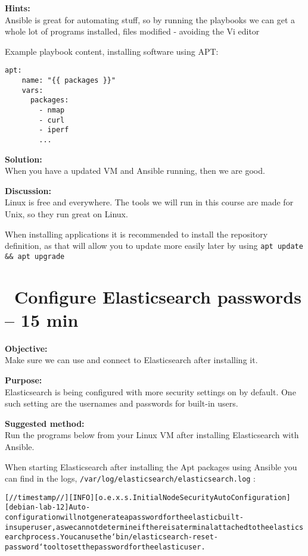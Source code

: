 \documentclass[a4paper,11pt,notitlepage]{report}
\begin{document}
{\bf Hints:}\\
Ansible is great for automating stuff, so by running the playbooks we can get a whole lot of programs installed, files modified - avoiding the Vi editor \smiley

Example playbook content, installing software using APT:
\begin{verbatim}
apt:
    name: "{{ packages }}"
    vars:
      packages:
        - nmap
        - curl
        - iperf
        ...
\end{verbatim}

{\bf Solution:}\\
When you have a updated VM and Ansible running, then we are good.

{\bf Discussion:}\\
Linux is free and everywhere. The tools we will run in this course are made for Unix, so they run great on Linux.

When installing applications it is recommended to install the repository definition, as that will allow you to update more easily later by using \verb+apt update && apt upgrade+

\chapter{\faExclamationTriangle\ Configure Elasticsearch passwords -- 15 min}
\label{ex:elastic-password}

{\bf Objective:}\\
Make sure we can use and connect to Elasticsearch after installing it.

{\bf Purpose:}\\
Elasticsearch is being configured with more security settings on by default. One such setting are the usernames and passwords for built-in users.

{\bf Suggested method:}\\
Run the programs below from your Linux VM after installing Elasticsearch with Ansible.

When starting Elasticsearch after installing the Apt packages using Ansible you can find in the logs, \verb+/var/log/elasticsearch/elasticsearch.log+ :
\begin{alltt}
[//timestamp//][INFO ][o.e.x.s.InitialNodeSecurityAutoConfiguration] [debian-lab-12] Auto-configuration will not generate a password for the elastic built-in superuser, as we cannot  determine if there is a terminal attached to the elasticsearch process. You can use the `bin/elasticsearch-reset-password` tool to set the password for the elastic user.
\end{alltt}
\end{document}
